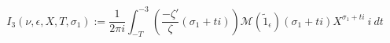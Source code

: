 \begin{definition}[I₃]
\label{I3}
\leanok
$$
  I_3(\nu, \epsilon, X, T, \sigma_1) := \frac{1}{2\pi i} \int_{-T}^{-3}
  \left(
  \frac{-\zeta'}\zeta(\sigma_1 + t i)
  \right)
    \mathcal M(\widetilde 1_\epsilon)(\sigma_1 + t i)
  X^{\sigma_1 + t i} \ i \ dt
  $$
\end{definition}
